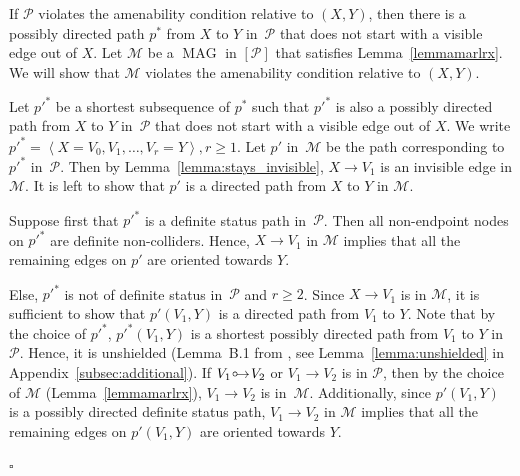 \documentclass[11pt,a4paper]{article}
\newenvironment{proofof}[1][]{\begin{trivlist}
   \item[\hskip \labelsep {\bfseries Proof of #1.}]}{\hfill{}$\square$\end{trivlist}}
\DeclareMathOperator{\MAG}{MAG}
\newcommand{\amen}{the amenability condition\xspace}
\newcommand{\g}[1][G]{\mathcal{#1}}
\newcommand{\pstar}[1][p]{{#1}^{*}}
\newcommand{\circarrow}{
  \setlength{\unitlength}{1mm}
  \begin{picture}(5,1)(0,0)
    \put(1,1){\circle{1}}
    \put(1.2,0){$\rightarrow$}
  \end{picture}
}
\begin{document}
\begin{proofof}[Lemma~\ref{lemmadirectedpath}]
If $\g[P]$ violates \amen{} relative to $(X,Y)$, then there is a possibly directed path $\pstar$ from $X$ to $Y$ in~$\g[P]$ that does not start with a visible edge out of $X$.
  Let $\g[M]$ be a $\MAG$ in $[\g[P]]$ that satisfies Lemma~\ref{lemmamarlrx}. 
  We will show that $\g[M]$ violates \amen{} relative to $(X,Y)$.

    Let $\pstar[p']$ be a shortest subsequence of $\pstar$ such that $\pstar[p']$ is also a possibly directed path from $X$ to $Y$ in~$\g[P]$ that does not start with a visible edge out of $X$. We write $\pstar[p'] = \left\langle X = V_0,V_{1}, \dots ,V_r= Y \right\rangle, r \ge 1$.
   Let $p'$ in~$\g[M]$ be the path corresponding to $\pstar[p']$ in~$\g[P]$.
  Then by Lemma~\ref{lemma:stays_invisible}, $X \rightarrow V_1$ is an invisible edge in $\g[M]$. It is left to show that $p'$ is a directed path from $X$ to $Y$ in $\g[M]$.

  Suppose first that $\pstar[p']$ is a definite status path in~$\g[P]$. Then all non-endpoint nodes on $\pstar[p']$ are definite non-colliders. Hence,  $X \rightarrow V_1$ in $\g[M]$ implies that all the remaining edges on $p'$ are oriented towards $Y$.

  Else, $\pstar[p']$ is not of definite status in~$\g[P]$ and $r \ge 2$.
   Since $X \to V_1$ is in $\g[M]$, it is sufficient to show that $p'(V_{1},Y)$ is a directed path from $V_{1}$ to $Y$.
   Note that by the choice of $\pstar[p']$, $\pstar[p'](V_{1},Y)$ is a shortest possibly directed path from $V_1$ to $Y$ in $\g[P]$. Hence, it is unshielded (Lemma~B.1 from \cite{zhang2008completeness}, see Lemma~\ref{lemma:unshielded} in Appendix~\ref{subsec:additional}).
   If $V_1 \circarrow V_2$ or $V_1 \rightarrow V_2$ is in $\g[P]$, then by the choice of $\g[M]$ (Lemma~\ref{lemmamarlrx}), $V_1 \to V_2$ is in~$\g[M]$. Additionally, since $p'(V_{1},Y)$ is a possibly directed definite status path, $V_1 \rightarrow V_2$ in $\g[M]$ implies that all the remaining edges on $p'(V_1,Y)$ are oriented towards $Y$.


\end{proofof}
\end{document}

